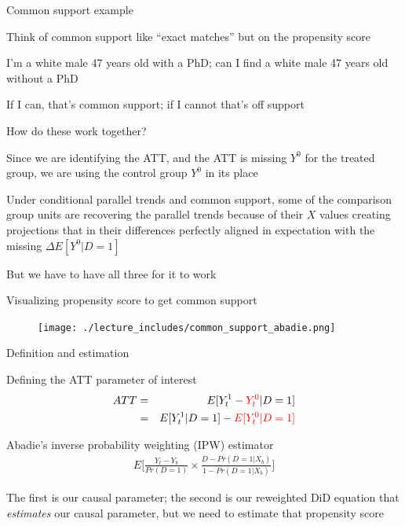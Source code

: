 \documentclass{beamer}
\begin{document}
\begin{frame}{Common support example}

Think of common support like ``exact matches'' but on the propensity score

\bigskip

I'm a white male 47 years old with a PhD; can I find a white male 47 years old without a PhD

\bigskip

If I can, that's common support; if I cannot that's off support

\end{frame}




\begin{frame}{How do these work together?}

Since we are identifying the ATT, and the ATT is missing $Y^0$ for the treated group, we are using the control group $Y^0$ in its place 

\bigskip

Under conditional parallel trends and common support, some of the comparison group units are recovering the parallel trends because of their $X$ values creating projections that in their differences perfectly aligned in expectation with the missing $\Delta E[Y^0|D=1]$

\bigskip

But we have to have all three for it to work

\end{frame}

\begin{frame}{Visualizing propensity score to get common support}

	\begin{figure}
	\texttt{[image: ./lecture\_includes/common\_support\_abadie.png]}
	\end{figure}

\end{frame}

\begin{frame}{Definition and estimation}

Defining the ATT parameter of interest
\begin{eqnarray*}
ATT &=& E[Y^1_t - \textcolor{red}{Y^0_t} |D=1] \\
&=&E[Y^1_t  | D = 1 ] - \textcolor{red}{E[Y^0_t | D=1]}
\end{eqnarray*}

\bigskip
Abadie's inverse probability weighting (IPW) estimator
\begin{eqnarray*}
E\bigg [ \frac{Y_t - Y_b}{Pr(D=1)} \times \frac{D - Pr(D=1|X_b)}{1-Pr(D=1|X_b)} \bigg ]
\end{eqnarray*}

\bigskip

The first is our causal parameter; the second is our reweighted DiD equation that \emph{estimates} our causal parameter, but we need to estimate that propensity score


\end{frame}
\end{document}
